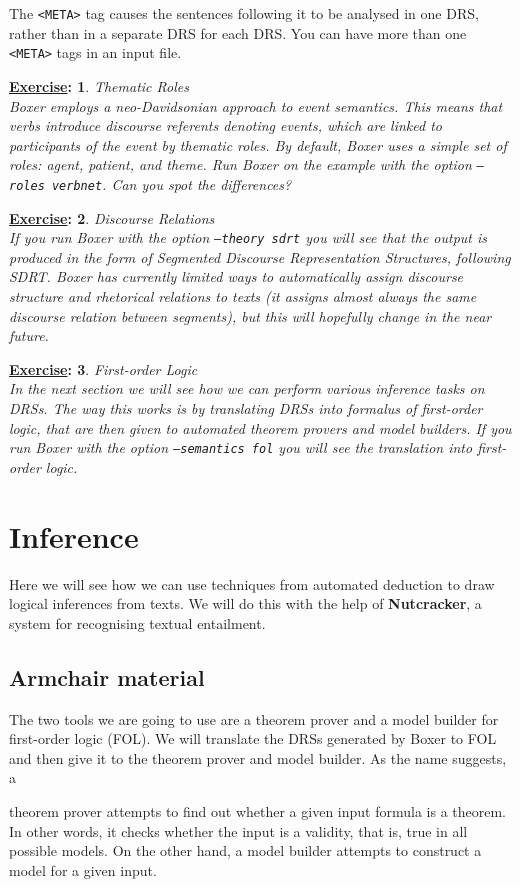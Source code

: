 \documentclass[11pt]{article}
\newtheorem{exercisebb}{\textbf{\underline{Exercise}:}}[section]
\newcommand{\bx}[1]{\begin{exercisebb} \rm #1\\}
\newcommand{\ex}{\end{exercisebb}}
\newcommand{\mnote}[1]
{
  \marginpar{\small #1}
  #1
}
\begin{document}
The \texttt{<META>} tag causes the sentences following it to be
analysed in one DRS, rather than in a separate DRS for each DRS. You
can have more than one \texttt{<META>} tags in an input file.



\bx{Thematic Roles}
Boxer employs a neo-Davidsonian approach to event semantics. This
means that verbs introduce discourse referents denoting events, which
are linked to participants of the event by thematic roles. By default,
Boxer uses a simple set of roles: agent, patient, and theme.  Run Boxer
on the example with the option \texttt{--roles verbnet}. Can you spot
the differences?
\ex

\bx{Discourse Relations} If you run Boxer with the option
\texttt{--theory sdrt} you will see that the output is produced in
the form of Segmented Discourse Representation Structures, following
SDRT.  Boxer has currently limited ways to automatically assign
discourse structure and rhetorical relations to texts (it assigns
almost always the same discourse relation between segments), but this
will hopefully change in the near future.
\ex

\bx{First-order Logic} In the next section we will see how we can
perform various inference tasks on DRSs.  The way this works is by
translating DRSs into formalus of first-order logic, that are then
given to automated theorem provers and model builders.  If you run
Boxer with the option \texttt{--semantics fol} you will see the
translation into first-order logic.  
\ex

%
%
\clearpage
\section{Inference}\label{section:inference}

Here we will see how we can use techniques from automated deduction to
draw logical inferences from texts. We will do this with the help of
\textbf{Nutcracker}, a system for recognising textual entailment.

\subsection*{Armchair material}

The two tools we are going to use are a theorem prover and a model
builder for first-order logic (FOL).  We will
translate the DRSs generated by Boxer to FOL and then give it to the
theorem prover and model builder.  As the name suggests, a
\mnote{theorem prover} attempts to find out whether a given input
formula is a theorem. In other words, it checks whether the input is a
validity, that is, true in all possible models. On the other hand, a \mnote{model
builder} attempts to construct a model for a given
input.
\end{document}

